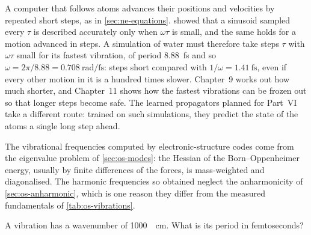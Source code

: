 A computer that follows atoms advances their positions and velocities by
repeated short steps, as in \cref{sec:ne-equations}. 
showed that a sinusoid sampled every $\tau$ is described accurately only
when $\omega\tau$ is small, and the same holds for a motion advanced in
steps. A simulation of water must therefore take steps $\tau$ with
$\omega\tau$ small for its fastest vibration, of period
\SI{8.88}{\femto\second} and so $\omega = 2\pi/8.88 =
\SI{0.708}{\radian\per\femto\second}$: steps short compared with $1/\omega
= \SI{1.41}{\femto\second}$, even if every other motion in it is a hundred
times slower. Chapter~9 works out how much
shorter, and Chapter~11 shows how the fastest vibrations can be frozen out
so that longer steps become safe. The learned propagators planned for Part~VI take
a different route: trained on such simulations, they predict the state of
the atoms a single long step ahead.

\begin{bridge}
The vibrational frequencies computed by electronic-structure codes come
from the eigenvalue problem of \cref{sec:os-modes}: the Hessian of
the Born--Oppenheimer energy, usually by finite differences of the forces,
is mass-weighted and diagonalised. The harmonic frequencies so obtained
neglect the anharmonicity of \cref{sec:os-anharmonic}, which is one
reason they differ from the measured fundamentals of
\cref{tab:os-vibrations}.
\end{bridge}

\begin{selfcheck}
A vibration has a wavenumber of \SI{1000}{\per\centi\metre}. What is its
period in femtoseconds?
\end{selfcheck}
